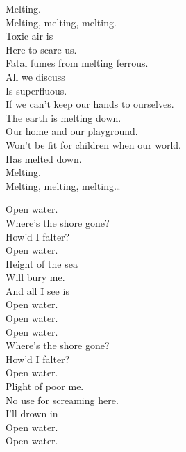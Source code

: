 Melting. \\
Melting, melting, melting. \\

Toxic air is \\
Here to scare us. \\
Fatal fumes from melting ferrous. \\
All we discuss \\
Is superfluous. \\
If we can't keep our hands to ourselves. \\

The earth is melting down. \\
Our home and our playground. \\
Won't be fit for children when our world. \\
Has melted down. \\

Melting. \\
Melting, melting, melting… \\




Open water. \\
Where's the shore gone? \\
How'd I falter? \\
Open water. \\

Height of the sea \\
Will bury me. \\
And all I see is \\
Open water. \\

Open water. \\

Open water. \\
Where's the shore gone? \\
How'd I falter? \\
Open water. \\

Plight of poor me. \\
No use for screaming here. \\
I'll drown in \\
Open water. \\

Open water. \\

